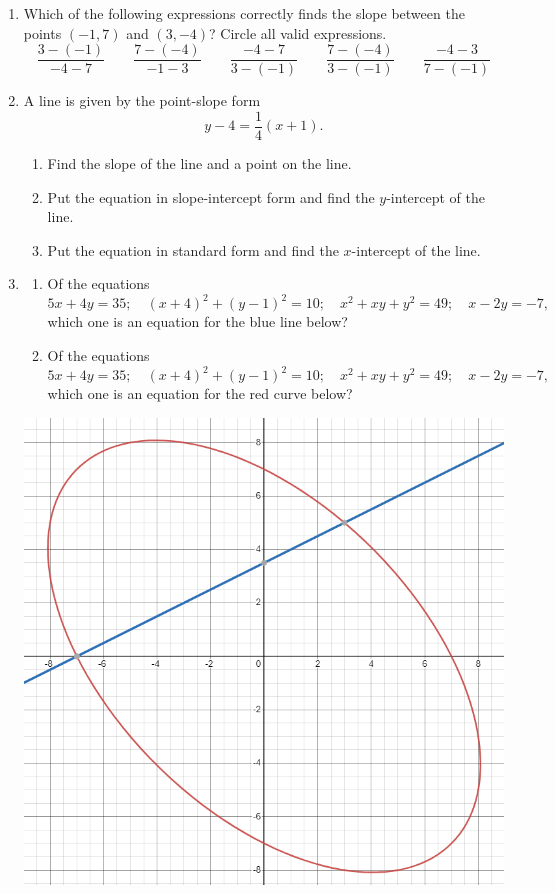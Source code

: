 \documentclass{article}
\begin{document}
\begin{enumerate}
\begin{enumerate}
\end{enumerate}
\item Which of the following expressions correctly finds the slope between the points $(-1,7)$ and $(3,-4)$? Circle all valid expressions.
\begin{equation*}
\frac{3 - (-1)}{-4 - 7}\qquad\frac{7 - (-4)}{-1 - 3}\qquad\frac{-4 - 7}{3 - (-1)}\qquad\frac{7 - (-4)}{3 - (-1)}\qquad\frac{-4 - 3}{7 - (-1)}
\end{equation*}
\item A line is given by the point-slope form
\begin{equation*}
y - 4 = \frac{1}{4}(x + 1).
\end{equation*}
\begin{enumerate}
\item Find the slope of the line and a point on the line.
\item Put the equation in slope-intercept form and find the $y$-intercept of the line.
\item Put the equation in standard form and find the $x$-intercept of the line.
\end{enumerate}
\item \begin{enumerate}
\item Of the equations
\begin{equation*}
5x + 4y = 35;\quad (x + 4)^2 + (y - 1)^2 = 10;\quad x^2 + xy + y^2 = 49;\quad x - 2y = -7,
\end{equation*}
which one is an equation for the blue line below?
\item Of the equations
\begin{equation*}
5x + 4y = 35;\quad (x + 4)^2 + (y - 1)^2 = 10;\quad x^2 + xy + y^2 = 49;\quad x - 2y = -7,
\end{equation*}
which one is an equation for the red curve below?
\end{enumerate}
\begin{center}
\includegraphics[scale=0.5]{graphing-line-ellipse.png}

\end{center}
\end{enumerate}
\end{document}
